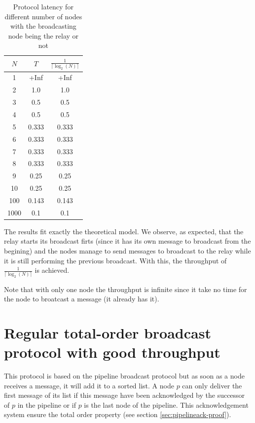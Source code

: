 \documentclass[a4paper]{article}
\begin{document}
\begin{table}[H]
\centering
\begin{tabular}{|c|c|c|}
    \hline
    $N$   & $T$  & $\frac{1}{\lceil\log_2(N)\rceil}$ \\
    \hline
    1     & +Inf   & +Inf   \\
    2     & 1.0    & 1.0    \\
    3     & 0.5    & 0.5    \\
    4     & 0.5    & 0.5    \\
    5     & 0.333  & 0.333  \\
    6     & 0.333  & 0.333  \\
    7     & 0.333  & 0.333  \\
    8     & 0.333  & 0.333  \\
    9     & 0.25   & 0.25   \\
    10    & 0.25   & 0.25   \\
    100   & 0.143  & 0.143  \\
    1000  & 0.1    & 0.1    \\
    \hline
\end{tabular}
\caption{Protocol latency for different number of nodes with the broadcasting node being the relay or not}
\label{table:thr}
\end{table}

The results fit exactly the theoretical model. We observe, as expected, that
the relay starts its broadcast firts (since it has its own message to
broadcast from the begining) and the nodes manage to send messages to
broadcast to the relay while it is still performing the previous broadcast.
With this, the throughput of $\frac{1}{\lceil\log_2(N)\rceil}$ is achieved.

Note that with only one node the throughput is infinite since it take no time
for the node to broatcast a message (it already has it).

\section{Regular total-order broadcast protocol with good throughput}
\label{sec:throughputTO}

This protocol is based on the pipeline broadcast protocol but as soon as a node
receives a message, it will add it to a sorted list. A node $p$ can only deliver the
first message of its list if this message have been acknowledged by the
successor of $p$ in the pipeline or if $p$ is the last node of the pipeline.
This acknowledgement system ensure the total order property (see section
\ref{sec:pipelineack-proof}).
\end{document}
